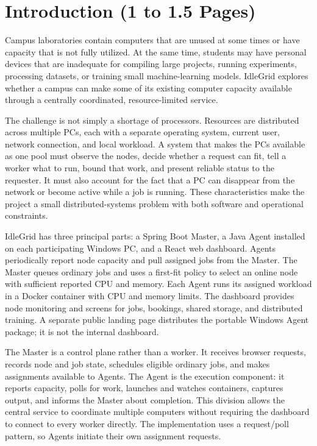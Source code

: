 \documentclass{article}
\begin{document}
	\pagebreak
	\section{Introduction (1 to 1.5 Pages)}
    
Campus laboratories contain computers that are unused at some times or have capacity that is not fully utilized. At the same time, students may have personal devices that are inadequate for compiling large projects, running experiments, processing datasets, or training small machine-learning models. IdleGrid explores whether a campus can make some of its existing computer capacity available through a centrally coordinated, resource-limited service.

The challenge is not simply a shortage of processors. Resources are distributed across multiple PCs, each with a separate operating system, current user, network connection, and local workload. A system that makes the PCs available as one pool must observe the nodes, decide whether a request can fit, tell a worker what to run, bound that work, and present reliable status to the requester. It must also account for the fact that a PC can disappear from the network or become active while a job is running. These characteristics make the project a small distributed-systems problem with both software and operational constraints.

IdleGrid has three principal parts: a Spring Boot Master, a Java Agent installed on each participating Windows PC, and a React web dashboard. Agents periodically report node capacity and pull assigned jobs from the Master. The Master queues ordinary jobs and uses a first-fit policy to select an online node with sufficient reported CPU and memory. Each Agent runs its assigned workload in a Docker container with CPU and memory limits. The dashboard provides node monitoring and screens for jobs, bookings, shared storage, and distributed training. A separate public landing page distributes the portable Windows Agent package; it is not the internal dashboard.

The Master is a control plane rather than a worker. It receives browser requests, records node and job state, schedules eligible ordinary jobs, and makes assignments available to Agents. The Agent is the execution component: it reports capacity, polls for work, launches and watches containers, captures output, and informs the Master about completion. This division allows the central service to coordinate multiple computers without requiring the dashboard to connect to every worker directly. The implementation uses a request/poll pattern, so Agents initiate their own assignment requests.
\end{document}
